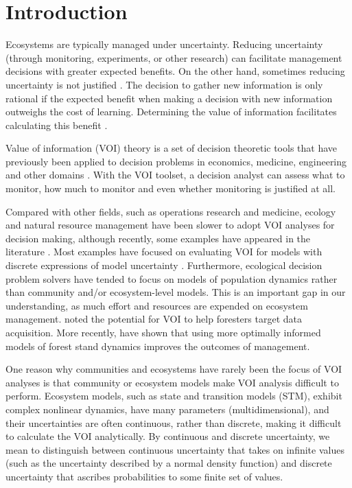 \documentclass[draft]{article}
\theoremstyle{definition}
\theoremstyle{definition}
\theoremstyle{definition}
\theoremstyle{remark}
\begin{document}
\section*{Introduction}\label{introduction}

Ecosystems are typically managed under uncertainty. Reducing uncertainty
(through monitoring, experiments, or other research) can facilitate
management decisions with greater expected benefits. On the other hand,
sometimes reducing uncertainty is not justified
\citep{Mcdonaldmadden2010}. The decision to gather new information is
only rational if the expected benefit when making a decision with new
information outweighs the cost of learning. Determining the value of
information facilitates calculating this benefit \citep{Raiffa1961}.

Value of information (VOI) theory is a set of decision theoretic tools
that have previously been applied to decision problems in economics,
medicine, engineering and other domains
\citep{Dakins1999, Yokota2004a, Claxton2008, Wu2013, Keisler2014}. With
the VOI toolset, a decision analyst can assess what to monitor, how much
to monitor and even whether monitoring is justified at all.

Compared with other fields, such as operations research and medicine,
ecology and natural resource management have been slower to adopt VOI
analyses for decision making, although recently, some examples have
appeared in the literature
\citep[e.g.,][]{Polasky2001, Moore2011, Runge2011a, Runting2013}. Most
examples have focused on evaluating VOI for models with discrete
expressions of model uncertainty \citep[e.g.,][]{Moore2012}.
Furthermore, ecological decision problem solvers have tended to focus on
models of population dynamics
\citep{Runge2011a, Johnson2014a, Canessa2015, Maxwell2015} rather than
community and/or ecosystem-level models. This is an important gap in our
understanding, as much effort and resources are expended on ecosystem
management. \citet{Kangas2010} noted the potential for VOI to help
foresters target data acquisition. More recently, \citet{Roessiger2016}
have shown that using more optimally informed models of forest stand
dynamics improves the outcomes of management.

One reason why communities and ecosystems have rarely been the focus of
VOI analyses is that community or ecosystem models make VOI analysis
difficult to perform. Ecosystem models, such as state and transition
models (STM), exhibit complex nonlinear dynamics, have many parameters
(multidimensional), and their uncertainties are often continuous, rather
than discrete, making it difficult to calculate the VOI analytically. By
continuous and discrete uncertainty, we mean to distinguish between
continuous uncertainty that takes on infinite values (such as the
uncertainty described by a normal density function) and discrete
uncertainty that ascribes probabilities to some finite set of values.
\end{document}
